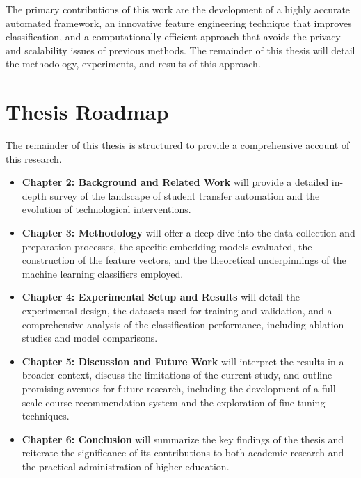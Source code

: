 The primary contributions of this work are the development of a highly accurate automated framework, an innovative feature engineering technique that improves classification, and a computationally efficient approach that avoids the privacy and scalability issues of previous methods. The remainder of this thesis will detail the methodology, experiments, and results of this approach.

\section{Thesis Roadmap}
The remainder of this thesis is structured to provide a comprehensive account of this research.
\begin{itemize}
    \item \textbf{Chapter 2: Background and Related Work} will provide a detailed in-depth survey of the landscape of student transfer automation and the evolution of technological interventions.
    \item \textbf{Chapter 3: Methodology} will offer a deep dive into the data collection and preparation processes, the specific embedding models evaluated, the construction of the feature vectors, and the theoretical underpinnings of the machine learning classifiers employed.
    \item \textbf{Chapter 4: Experimental Setup and Results} will detail the experimental design, the datasets used for training and validation, and a comprehensive analysis of the classification performance, including ablation studies and model comparisons.
    \item \textbf{Chapter 5: Discussion and Future Work} will interpret the results in a broader context, discuss the limitations of the current study, and outline promising avenues for future research, including the development of a full-scale course recommendation system and the exploration of fine-tuning techniques.
    \item \textbf{Chapter 6: Conclusion} will summarize the key findings of the thesis and reiterate the significance of its contributions to both academic research and the practical administration of higher education.
\end{itemize}